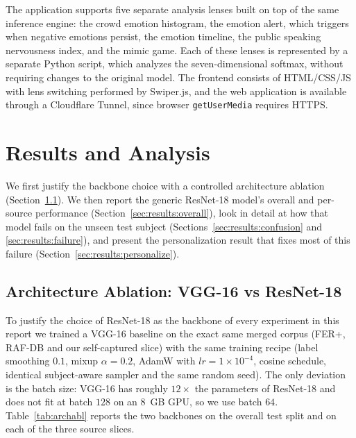 \documentclass[12pt,a4paper]{article}
\begin{document}
The application supports five separate analysis lenses built on
top of the same inference engine: the crowd emotion histogram,
the emotion alert, which triggers when negative emotions
persist, the emotion timeline, the public speaking nervousness
index, and the mimic game. Each of these lenses is represented
by a separate Python script, which analyzes the
seven-dimensional softmax, without requiring changes to the
original model. The frontend consists of HTML/CSS/JS with lens
switching performed by Swiper.js, and the web application is
available through a Cloudflare Tunnel, since browser
\texttt{getUserMedia} requires HTTPS.










\section{Results and Analysis}
\label{sec:results}

We first justify the backbone choice with a controlled
architecture ablation (Section~\ref{sec:results:archabl}). We
then report the generic ResNet-18 model's overall and
per-source performance (Section~\ref{sec:results:overall}),
look in detail at how that model fails on the unseen test
subject (Sections~\ref{sec:results:confusion} and
\ref{sec:results:failure}), and present the personalization
result that fixes most of this failure
(Section~\ref{sec:results:personalize}).

\subsection{Architecture Ablation: VGG-16 vs ResNet-18}
\label{sec:results:archabl}

To justify the choice of ResNet-18 as the backbone of every
experiment in this report we trained a VGG-16 baseline
\autocite{simonyan2015vgg} on the exact same merged corpus
(FER+, RAF-DB and our self-captured slice) with the same
training recipe (label smoothing $0.1$, mixup $\alpha=0.2$,
AdamW with $lr=1\times 10^{-4}$, cosine schedule, identical
subject-aware sampler and the same random seed). The only
deviation is the batch size: VGG-16 has roughly $12\times$
the parameters of ResNet-18 and does not fit at batch $128$
on an $8$~GB GPU, so we use batch $64$.
Table~\ref{tab:archabl} reports the two backbones on the
overall test split and on each of the three source slices.
\end{document}
